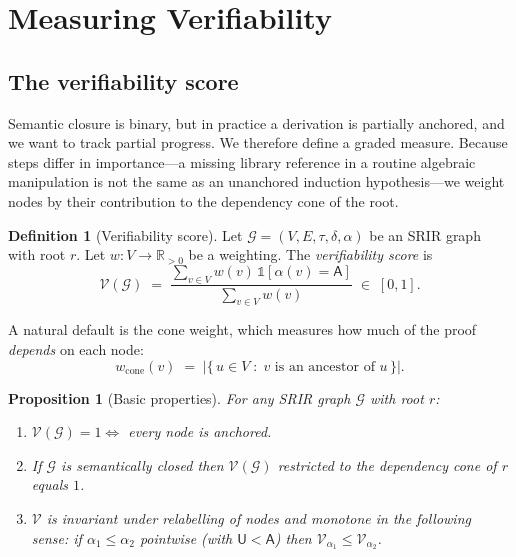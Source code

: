 \documentclass[11pt,a4paper]{article}
\theoremstyle{definition}
\newtheorem{definition}{Definition}[section]
\theoremstyle{plain}
\newtheorem{proposition}{Proposition}[section]
\theoremstyle{remark}
\newcommand{\V}{\mathcal{V}}           %
\begin{document}
\section{Measuring Verifiability}
\label{sec:verifiability}

\subsection{The verifiability score}

Semantic closure is binary, but in practice a derivation is partially anchored,
and we want to track partial progress. We therefore define a graded measure.
Because steps differ in importance---a missing library reference in a routine
algebraic manipulation is not the same as an unanchored induction hypothesis---we
weight nodes by their contribution to the dependency cone of the root.

\begin{definition}[Verifiability score]
\label{def:vscore}
Let $\mathcal{G} = (V,E,\tau,\delta,\alpha)$ be an SRIR graph with root $r$. Let
$w : V \to \mathbb{R}_{>0}$ be a weighting. The \emph{verifiability score} is
\[
  \V(\mathcal{G}) \;=\;
  \frac{\sum_{v \in V} w(v)\,\mathbb{1}[\alpha(v) = \mathsf{A}]}
       {\sum_{v \in V} w(v)}
  \;\in\; [0,1].
\]
\end{definition}

A natural default is the cone weight, which measures how much of the proof
\emph{depends} on each node:
\[
  w_{\mathrm{cone}}(v) \;=\; \bigl|\{\, u \in V \;:\; v \text{ is an ancestor of } u \,\}\bigr| .
\]

\begin{proposition}[Basic properties]
\label{prop:vprops}
For any SRIR graph $\mathcal{G}$ with root $r$:
\begin{enumerate}
  \item $\V(\mathcal{G}) = 1 \iff$ every node is anchored.
  \item If $\mathcal{G}$ is semantically closed then $\V(\mathcal{G})$ restricted
        to the dependency cone of $r$ equals $1$.
  \item $\V$ is invariant under relabelling of nodes and monotone in the
        following sense: if $\alpha_1 \le \alpha_2$ pointwise (with
        $\mathsf{U} < \mathsf{A}$) then $\V_{\alpha_1} \le \V_{\alpha_2}$.
\end{enumerate}
\end{proposition}
\end{document}
